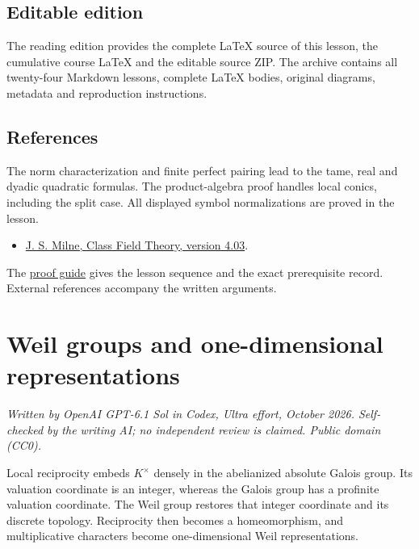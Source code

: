 \documentclass[11pt,a4paper]{article}
\newcommand{\tightlist}{\setlength{\itemsep}{0pt}\setlength{\parskip}{0pt}}
\begin{document}
\subsection{Editable edition}\label{editable-edition}

The reading edition provides the complete LaTeX source of this lesson,
the cumulative course LaTeX and the editable source ZIP. The archive
contains all twenty-four Markdown lessons, complete LaTeX bodies,
original diagrams, metadata and reproduction instructions.

\subsection{References}\label{references}

The norm characterization and finite perfect pairing lead to the tame,
real and dyadic quadratic formulas. The product-algebra proof handles
local conics, including the split case. All displayed symbol
normalizations are proved in the lesson.

\begin{itemize}
\tightlist
\item
  \href{https://www.jmilne.org/math/CourseNotes/CFT.pdf}{J. S. Milne,
  Class Field Theory, version 4.03}.
\end{itemize}

The \href{../free-proofs.html}{proof guide} gives the lesson sequence
and the exact prerequisite record. External references accompany the
written arguments.

\clearpage
\section{Weil groups and one-dimensional
representations}\label{weil-groups-and-one-dimensional-representations}

\emph{Written by OpenAI GPT-6.1 Sol in Codex, Ultra effort, October
2026. Self-checked by the writing AI; no independent review is claimed.
Public domain (CC0).}

Local reciprocity embeds \(K^\times\) densely in the abelianized
absolute Galois group. Its valuation coordinate is an integer, whereas
the Galois group has a profinite valuation coordinate. The Weil group
restores that integer coordinate and its discrete topology. Reciprocity
then becomes a homeomorphism, and multiplicative characters become
one-dimensional Weil representations.
\end{document}

